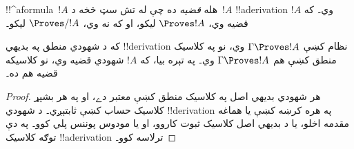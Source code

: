 \documentclass[../../../include/open-logic-section]{subfiles}
\begin{document}
\begin{defn}[قضيې]
!!^a{formula}~$!A$ هله \emph{قضيه} ده چې له تش سټ څخه د~$!A$
!!a{derivation} وي۔ که $!A$ قضيه وي، $\Proves !A$ ليکو، او که
نه وي، $\Proves/ !A$ ليکو۔
\end{defn}

\begin{prop}
  که د شهودي منطق په بديهي !!{derivation} نظام کښې
  $\Gamma \Proves !A$ وي، نو په کلاسيک منطق کښې هم
  $\Gamma \Proves !A$ وي۔ په تېره بيا، که $!A$ شهودي قضيه وي،
  نو کلاسيکه قضيه هم ده۔
\end{prop}

\begin{proof}
  هر شهودي بديهي اصل په کلاسيک منطق کښې معتبر دے، او په هر
  بشپړ کلاسيک حساب کښې ثابتېږي۔ د شهودي !!{derivation} په هره کرښه
  کښې يا هماغه مقدمه اخلو، يا د بديهي اصل کلاسيک ثبوت کاروو،
  او يا مودوس پوننس پلي کوو۔ په دې توګه کلاسيک !!a{derivation}
  ترلاسه کوو۔
\end{proof}
\end{document}
